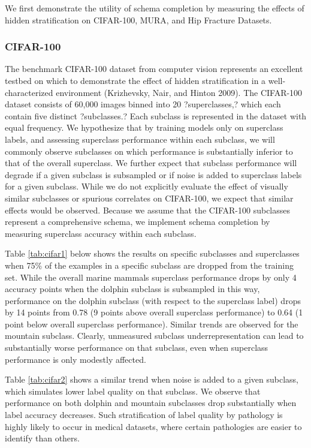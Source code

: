 \documentclass{article}
\begin{document}
We first demonstrate the utility of schema completion by measuring the effects of hidden stratification on CIFAR-100, MURA, and Hip Fracture Datasets.

\subsubsection{CIFAR-100}

The benchmark CIFAR-100 dataset from computer vision represents an excellent testbed on which to demonstrate the effect of hidden stratification in a well-characterized environment (Krizhevsky, Nair, and Hinton 2009).  
The CIFAR-100 dataset consists of 60,000 images binned into 20 ?superclasses,? which each contain five distinct ?subclasses.? 
 Each subclass is represented in the dataset with equal frequency.  
 We hypothesize that by training models only on superclass labels, and assessing superclass performance within each subclass, we will commonly observe subclasses on which performance is substantially inferior to that of the overall superclass.  
 We further expect that subclass performance will degrade if a given subclass is subsampled or if noise is added to superclass labels for a given subclass.  
 While we do not explicitly evaluate the effect of visually similar subclasses or spurious correlates on CIFAR-100, we expect that similar effects would be observed.  
 Because we assume that the CIFAR-100 subclasses represent a comprehensive schema, we implement schema completion by measuring superclass accuracy within each subclass.
 
 Table \ref{tab:cifar1} below shows the results on specific subclasses and superclasses when 75\% of the examples in a specific subclass are dropped from the training set.  While the overall marine mammals superclass performance drops by only 4 accuracy points when the dolphin subclass is subsampled in this way, performance on the dolphin subclass (with respect to the superclass label) drops by 14 points from 0.78 (9 points above overall superclass performance) to 0.64 (1 point below overall superclass performance).  Similar trends are observed for the mountain subclass.  Clearly, unmeasured subclass underrepresentation can lead to substantially worse performance on that subclass, even when superclass performance is only modestly affected.
 
Table \ref{tab:cifar2} shows a similar trend when noise is added to a given subclass, which simulates lower label quality on that subclass.  We observe that performance on both dolphin and mountain subclasses drop substantially when label accuracy decreases.  Such stratification of label quality by pathology is highly likely to occur in medical datasets, where certain pathologies are easier to identify than others.
\end{document}
